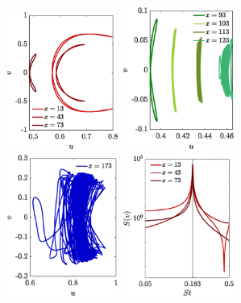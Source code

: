 \begin{figure}
  \label{fig:wake}
\end{figure}

\begin{figure}
\centering
\includegraphics[width=0.328\textwidth]{./fig/appendix/uv_xw_AR3_Re450_a.eps}
\includegraphics[width=0.328\textwidth]{./fig/appendix/uv_xw_AR3_Re450_b.eps}
\includegraphics[width=0.328\textwidth]{./fig/appendix/uv_xw_AR3_Re450_c.eps}
\includegraphics[width=0.328\textwidth]{./fig/appendix/Spec_AR3_Re450_a.eps}

\end{figure}
